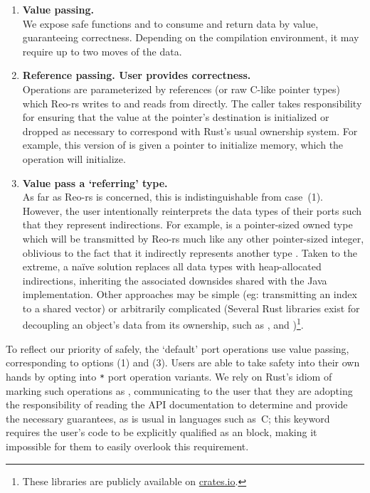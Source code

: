 \begin{enumerate}
	\item \textbf{Value passing.}\\
	We expose safe functions  and  to consume and return data by value, guaranteeing correctness. Depending on the compilation environment, it may require up to two moves of the data.
	
	\item \textbf{Reference passing. User provides correctness.}\\
	Operations are parameterized by references (or raw C-like pointer types) which Reo-rs writes to and reads from directly. The caller takes responsibility for ensuring that the value at the pointer's destination is initialized or dropped as necessary to correspond with Rust's usual ownership system. For example, this version of  is given a pointer to initialize memory, which the operation will initialize.
	
	\item \textbf{Value pass a `referring' type.}\\
	As far as Reo-rs is concerned, this is indistinguishable from case~(1). However, the user intentionally reinterprets the data types of their ports such that they represent indirections. For example,  is a pointer-sized owned type which will be transmitted by Reo-rs much like any other pointer-sized integer, oblivious to the fact that it indirectly represents another type . Taken to the extreme, a na\"ive solution replaces all data types with heap-allocated indirections, inheriting the associated downsides shared with the Java implementation. Other approaches may be simple (eg: transmitting an index to a shared vector) or arbitrarily complicated (Several Rust libraries exist for decoupling an object's data from its ownership, such as ,  and )\footnote{These libraries are publicly available on \url{crates.io}.}. 
\end{enumerate}

To reflect our priority of safely, the `default' port operations use value passing, corresponding to options (1) and (3). Users are able to take safety into their own hands by opting into \texttt{*} port operation variants. We rely on Rust's idiom of marking such operations as , communicating to the user that they are adopting the responsibility of reading the API documentation to determine and provide the necessary guarantees, as is usual in languages such as~C; this keyword requires the user's code to be explicitly qualified as an  block, making it impossible for them to easily overlook this requirement. 

